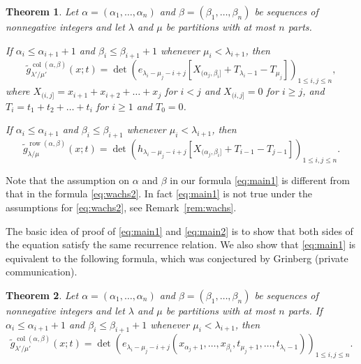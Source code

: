 \documentclass[12pt]{amsart}
\numberwithin{equation}{section}
\newtheorem{thm}{Theorem}[section]
\theoremstyle{definition}
\newcommand\wg{\widetilde{g}}
\newcommand\col{\operatorname{col}}
\newcommand\row{\operatorname{row}}
\begin{document}
\begin{thm} \label{thm:main} Let $\alpha=(\alpha_1,\dots,\alpha_n)$ and
  $\beta=(\beta_1,\dots,\beta_n)$ be sequences of nonnegative
  integers and let $\lambda$ and $\mu$ be partitions with at most $n$ parts.

  If $\alpha_i\le \alpha_{i+1}+1$ and $\beta_i\le \beta_{i+1}+1$ whenever
  $\mu_i<\lambda_{i+1}$, then
  \begin{equation}
\label{eq:main1}
  \wg_{\lambda'/\mu'}^{\col(\alpha,\beta)}(x;t) = \det \left(
    e_{\lambda_i-\mu_j-i+j}[X_{(\alpha_j,\beta_i]}+T_{\lambda_i-1}-T_{\mu_j}]
  \right)_{1\le i,j\le n},
  \end{equation}
where $X_{(i,j]} = x_{i+1}+x_{i+2}+\dots+x_j$ for $i<j$ and $X_{(i,j]} = 0$ for
$i\ge j$, and $T_i=t_1+t_2+\dots+t_i$ for $i\ge1$ and $T_0=0$.

If $\alpha_i\le \alpha_{i+1}$ and $\beta_i\le \beta_{i+1}$ whenever
$\mu_i<\lambda_{i+1}$, then
\begin{equation}
\label{eq:main2}
\wg_{\lambda/\mu}^{\row(\alpha,\beta)}(x;t) = \det \left(
      h_{\lambda_i-\mu_j-i+j}[X_{(\alpha_j,\beta_i]}+T_{i-1}-T_{j-1}]
      \right)_{1\le i,j\le n}.
\end{equation}
\end{thm}

Note that the assumption on $\alpha$ and $\beta$ in our formula \eqref{eq:main1}
is different from that in the formula \eqref{eq:wachs2}. In fact
\eqref{eq:main1} is not true under the assumptions for \eqref{eq:wachs2}, see
Remark~\ref{rem:wachs}.

The basic idea of proof of \eqref{eq:main1} and \eqref{eq:main2} is to show that
both sides of the equation satisfy the same recurrence relation. We also show
that \eqref{eq:main1} is equivalent to the following formula, which was
conjectured by Grinberg (private communication).

\begin{thm}\label{thm:col_flag3}
  Let $\alpha=(\alpha_1,\dots,\alpha_n)$ and $\beta=(\beta_1,\dots,\beta_n)$ be
  sequences of nonnegative integers and let $\lambda$ and $\mu$ be
  partitions with at most $n$ parts. If $\alpha_i\le \alpha_{i+1}+1$ and
  $\beta_i\le \beta_{i+1}+1$ whenever $\mu_i<\lambda_{i+1}$, then
\begin{equation}
\wg_{\lambda'/\mu'}^{\col(\alpha,\beta)}(x;t)  = \det \left(
    e_{\lambda_i-\mu_j-i+j}(x_{\alpha_j+1},\dots, x_{\beta_i},t_{\mu_j+1},\dots,t_{\lambda_i-1})
  \right)_{1\le i,j\le n}.
\end{equation}
\end{thm}
\end{document}
